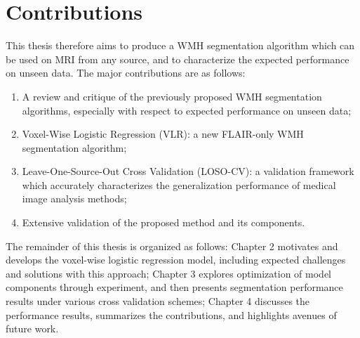 \section{Contributions}
This thesis therefore aims to produce a WMH segmentation algorithm which can be used on MRI from any source, and to characterize the expected performance on unseen data. The major contributions are as follows:
\begin{enumerate}
  \item A review and critique of the previously proposed WMH segmentation algorithms, especially with respect to expected performance on unseen data;
  \item Voxel-Wise Logistic Regression (VLR): a new FLAIR-only WMH segmentation algorithm;
  \item Leave-One-Source-Out Cross Validation (LOSO-CV): a validation framework which accurately characterizes the generalization performance of medical image analysis methods;
  \item Extensive validation of the proposed method and its components.
\end{enumerate}
The remainder of this thesis is organized as follows:
Chapter 2 motivates and develops the voxel-wise logistic regression model, including expected challenges and solutions with this approach;
Chapter 3 explores optimization of model components through experiment, and then presents segmentation performance results under various cross validation schemes;
Chapter 4 discusses the performance results, summarizes the contributions, and highlights avenues of future work.
